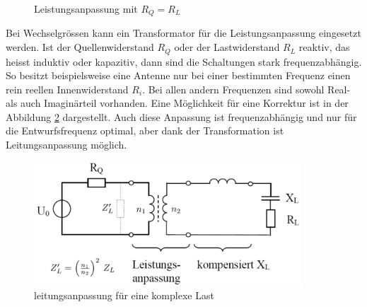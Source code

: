 \begin{figure}[h]
	\begin{center}
	\end{center}
\caption{Leistungsanpassung mit $R_Q = R_L$}
\label{fig:LeistungsanpassungU0_RQ_RL}
\end{figure}


Bei Wechselgrössen kann ein Transformator für die Leistungsanpassung eingesetzt werden. Ist der Quellenwiderstand $R_Q$ oder der Lastwiderstand $R_L$  reaktiv, das heisst induktiv oder kapazitiv, dann sind die Schaltungen stark frequenzabhängig. So besitzt beispielsweise eine Antenne nur bei einer bestimmten Frequenz einen rein reellen Innenwiderstand $R_i$. Bei allen andern Frequenzen sind sowohl Real- als auch Imaginärteil vorhanden. Eine Möglichkeit für eine Korrektur ist in der Abbildung \ref{AnpassungKomplexerLast} dargestellt. Auch diese  Anpassung ist frequenzabhängig und nur für die Entwurfsfrequenz optimal, aber dank der Transformation ist Leitungsanpassung möglich.
\begin{figure}[!h]
	\centering
	\includegraphics[width=10cm]{content/bilder/AnpassungKomplexerLast.pdf}%
	\caption{leitungsanpassung für eine komplexe Last \cite{Tekom}}
	\label{AnpassungKomplexerLast}
\end{figure}


